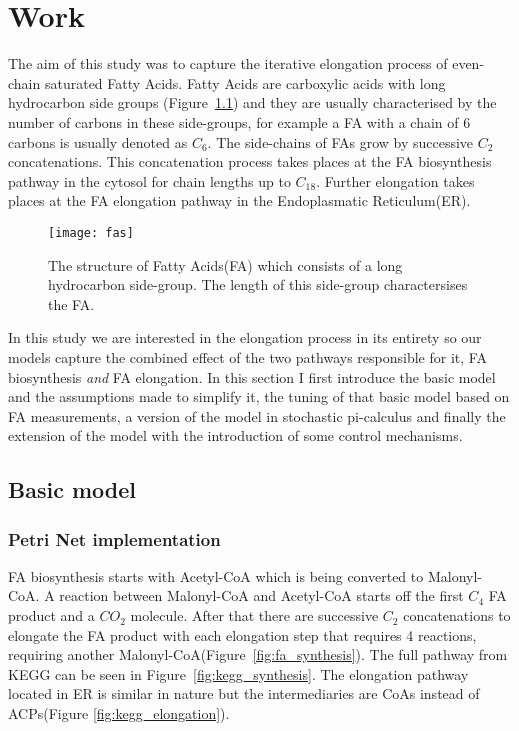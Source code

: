

\chapter{Work}
\label{chap:work}
\ifpdf
    \graphicspath{{Chapter3/Figs/Raster/}{Chapter3/Figs/PDF/}{Chapter3/Figs/}}
\else
    \graphicspath{{Chapter3/Figs/Vector/}{Chapter3/Figs/}}
\fi

The aim of this study was to capture the iterative elongation process
of even-chain saturated Fatty Acids. Fatty Acids are
carboxylic acids with long hydrocarbon side groups
(Figure~\ref{fig:fas}) and they are usually characterised by the
number of carbons in these side-groups, for example a FA with a chain
of 6 carbons is usually denoted as $C_6$. The side-chains of FAs grow
by successive $C_2$ concatenations. This concatenation process takes places at
the FA biosynthesis pathway in the cytosol for chain lengths up to
$C_{18}$. Further elongation takes places at the FA elongation
pathway in the Endoplasmatic Reticulum(ER).

\begin{figure}[htbp!]
\centering
\texttt{[image: fas]}
\caption[Fatty Acid structure]{The structure of Fatty Acids(FA) which
  consists of a long hydrocarbon side-group. The length of this
  side-group charactersises the FA.}
\label{fig:fas}
\end{figure}

In this study we are interested in the elongation process in its
entirety so our models capture the combined effect of the two pathways
responsible for it, FA biosynthesis \textit{and} FA elongation. In
this section I first introduce the basic model and the assumptions
made to simplify it, the tuning of that basic model based on FA
measurements, a version of the model in stochastic pi-calculus and
finally the extension of the model with the introduction of some
control mechanisms.

\section{Basic model}
\subsection{Petri Net implementation}
\label{sec:pn_implementation}
FA biosynthesis starts with Acetyl-CoA which is being converted to
Malonyl-CoA. A reaction between Malonyl-CoA and Acetyl-CoA starts off
the first $C_4$ FA product and a $CO_2$ molecule. After that there are successive $C_2$
concatenations to elongate the FA product with each elongation step
that requires 4 reactions, requiring another Malonyl-CoA(Figure~\ref{fig:fa_synthesis}). The
full pathway from KEGG can be seen in
Figure~\ref{fig:kegg_synthesis}. The elongation pathway located in ER
is similar in nature but the intermediaries are CoAs instead of
ACPs(Figure \ref{fig:kegg_elongation}).

